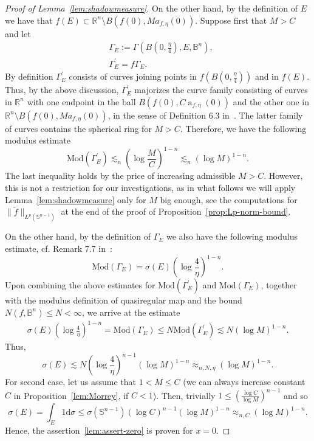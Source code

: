 \documentclass[11pt,a4paper,reqno]{amsart}
\theoremstyle{definition}
\renewcommand{\a}{\operatorname{a}}
\newcommand{\B}{\mathbb{B}^n}
\newcommand{\R}{\mathbb{R}}
\newcommand{\Rn}{{\mathbb R}^n}
\newcommand{\ud}{\mathrm {d}}
\newcommand{\Sn}{\mathbb{S}^{n-1}}
\numberwithin{komcounter}{section}
\begin{document}
\begin{appendix}
\begin{proof}[Proof of Lemma~\ref{lem:shadowmeasure}]
On the other hand, by the definition of $E$ we have that $f(E)\subset \R^n\setminus B(f(0),Ma_{f,\eta}(0))$. Suppose first that $M>C$ and let
\begin{align*}
&\Gamma_E:=\Gamma (B(0,\frac{\eta}{4}),E,\B ),\\
&\Gamma^\prime_E=f\Gamma_E .
\end{align*}
By definition $\Gamma^\prime_E$ consists of curves joining points in $f(B(0,\frac{\eta}{4}))$ and in $f(E)$. Thus, by the above discussion, $\Gamma^\prime_E$ majorizes the curve family consisting of curves in $\Rn$ with one endpoint in the ball $B(f(0),C\a_{f,\eta}(0))$ and the other one in $\Rn \setminus B(f(0),Ma_{f,\eta}(0))$, in the sense of Definition 6.3 in~\cite{va}. The latter family of curves contains the spherical ring for $M>C$. Therefore, we have the following modulus estimate
$$
 \mathrm{Mod}(\Gamma^\prime_E)\lesssim_n (\log \frac{M}{C})^{1-n}\lesssim_n (\log M)^{1-n}.
$$
The last inequality holds by the price of increasing admissible $M>C$. However, this is not a restriction for our investigations, as in what follows we will apply Lemma~\ref{lem:shadowmeasure} only for $M$ big enough, see the computations for $\|\tilde{f}\|_{L^p(\Sn)}$ at the end of the proof of Proposition~\ref{prop:Lp-norm-bound}.

On the other hand, by the definition of $\Gamma_E$ we also have the following modulus estimate, cf. Remark 7.7 in~\cite{va}:
$$
 \mathrm{Mod} (\Gamma_E)=\sigma (E)(\log\frac{4}{\eta})^{1-n}.
$$
Upon combining the above estimates for $\mathrm{Mod}(\Gamma^\prime_E)$ and $\mathrm{Mod} (\Gamma_E)$, together with the modulus definition of quasiregular map and the bound $N(f,\B )\leq N<\infty$, we arrive at the estimate
\begin{align*}
 \sigma (E)(\log\frac{4}{\eta})^{1-n} = \mathrm{Mod} (\Gamma_E)\leq N\mathrm{Mod}(\Gamma^\prime_E)\lesssim N (\log M)^{1-n}.
\end{align*}
Thus,
\[
\sigma (E)\lesssim N(\log\frac{4}{\eta})^{n-1} (\log M)^{1-n}\approx_{n, N, \eta}(\log M)^{1-n}.
\]
For second case, let us assume that $1<M\leq C$ (we can always increase constant $C$ in Proposition~\ref{lem:Morrey}, if $C<1$). Then, trivially $1 \leq \left(\frac{\log C}{\log M}\right)^{n-1}$ and so
\[
  \sigma(E)=\int_{E} 1\ud \sigma \leq \sigma(\Sn) (\log C)^{n-1}(\log M)^{1-n}\approx_{n,C}(\log M)^{1-n}.
\]
Hence, the assertion~\eqref{lem:assert-zero} is proven for $x=0$.
		

\end{proof}
\end{appendix}
\end{document}
